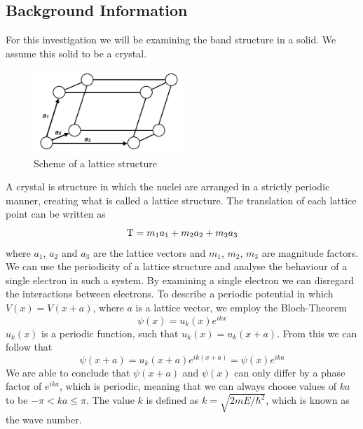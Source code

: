 \documentclass[12pt]{article}
\begin{document}
\subsection{Background Information}
For this investigation we will be examining the band structure in a solid. We assume this solid to be a crystal.
\begin{figure}[hbt]
	\caption{Scheme of a lattice structure}
	\includegraphics[width=0.5\textwidth]{introduction/crystalstructure}	
\end{figure}
A crystal is structure in which the nuclei are arranged in a strictly periodic manner, creating what is called a lattice structure. The translation of each lattice point can be written as
\begin{equation*}
	{\rm T} = m_1 a_1 + m_2 a_2 + m_3 a_3
\end{equation*}
where $a_1$, $a_2$ and $a_3$ are the lattice vectors and $m_1$, $m_2$, $m_3$ are magnitude factors. We can use the periodicity of a lattice structure and analyse the behaviour of a single electron in such a system. By examining a single electron we can disregard the interactions between electrons. To describe a periodic potential in which $V(x) = V(x+a)$, where $a$ is a lattice vector, we employ the Bloch-Theorem
\begin{equation}
	\psi (x) = u_k (x) e^{ikx}
\end{equation}
$u_k(x)$ is a periodic function, such that $u_k(x) = u_k(x+a)$. From this we can follow that
\begin{equation}
\psi(x+a) = u_k(x+a)e^{ik(x+a)} = \psi(x)e^{ika}
\end{equation}
We are able to conclude that $\psi(x+a)$ and $\psi(x)$ can only differ by a phase factor of $e^{ika}$, which is periodic, meaning that we can always choose values of $ka$ to be $-\pi < ka \leq \pi$. The value $k$ is defined as $k=\sqrt{2mE/\hbar^2}$, which is known as the wave number.
\end{document}
